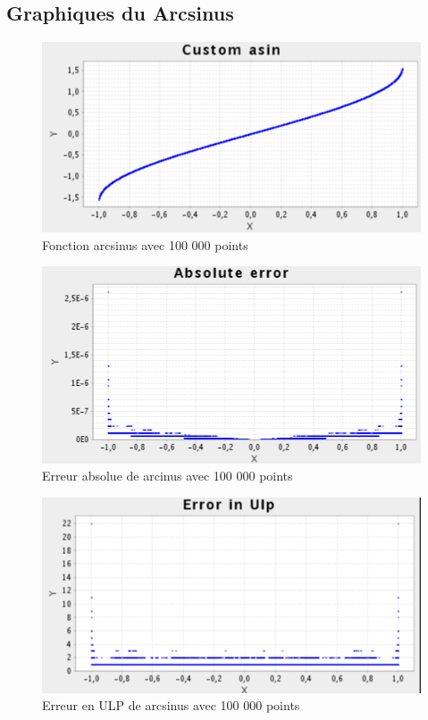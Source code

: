 \documentclass[12pt]{article}
\begin{document}
\subsection{Graphiques du Arcsinus}
\begin{figure}[h!]
  \begin{center}
    \includegraphics[scale=0.33]{asin.png}
    \caption{Fonction arcsinus avec 100 000 points}
    \label{Fonction arcsinus avec 100 000 points}
  \end{center}
\end{figure}
\begin{figure}[h!]
  \begin{center}
    \includegraphics[scale=0.33]{asin_abs.png}
    \caption{Erreur absolue de arcinus avec 100 000 points}
    \label{Erreur absolue de arcinus avec 100 000 points}
  \end{center}
\end{figure}
\begin{figure}[h!]
  \begin{center}
    \includegraphics[scale=0.33]{asin_ulp.png}
    \caption{Erreur en ULP de arcsinus avec 100 000 points}
    \label{Erreur en ULP de arcsinus avec 100 000 points}
  \end{center}
\end{figure}
\end{document}
